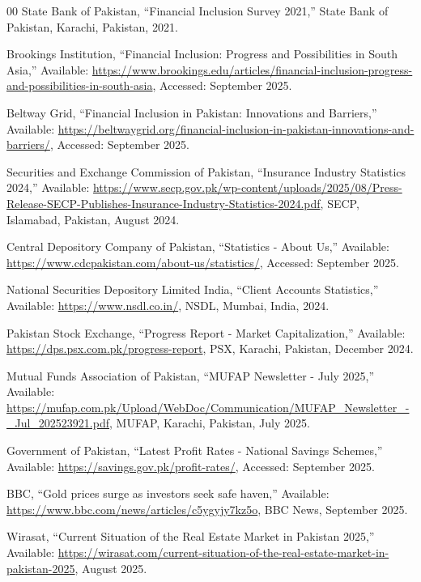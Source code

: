\documentclass[12pt]{article}
\begin{document}
\begin{thebibliography}{00}
 State Bank of Pakistan, ``Financial Inclusion Survey 2021,'' State Bank of Pakistan, Karachi, Pakistan, 2021.

 Brookings Institution, ``Financial Inclusion: Progress and Possibilities in South Asia,'' Available: \url{https://www.brookings.edu/articles/financial-inclusion-progress-and-possibilities-in-south-asia}, Accessed: September 2025.

 Beltway Grid, ``Financial Inclusion in Pakistan: Innovations and Barriers,'' Available: \url{https://beltwaygrid.org/financial-inclusion-in-pakistan-innovations-and-barriers/}, Accessed: September 2025.

 Securities and Exchange Commission of Pakistan, ``Insurance Industry Statistics 2024,'' Available: \url{https://www.secp.gov.pk/wp-content/uploads/2025/08/Press-Release-SECP-Publishes-Insurance-Industry-Statistics-2024.pdf}, SECP, Islamabad, Pakistan, August 2024.

 Central Depository Company of Pakistan, ``Statistics - About Us,'' Available: \url{https://www.cdcpakistan.com/about-us/statistics/}, Accessed: September 2025.

 National Securities Depository Limited India, ``Client Accounts Statistics,'' Available: \url{https://www.nsdl.co.in/}, NSDL, Mumbai, India, 2024.

 Pakistan Stock Exchange, ``Progress Report - Market Capitalization,'' Available: \url{https://dps.psx.com.pk/progress-report}, PSX, Karachi, Pakistan, December 2024.

 Mutual Funds Association of Pakistan, ``MUFAP Newsletter - July 2025,'' Available: \url{https://mufap.com.pk/Upload/WebDoc/Communication/MUFAP_Newsletter_-_Jul_202523921.pdf}, MUFAP, Karachi, Pakistan, July 2025.

 Government of Pakistan, ``Latest Profit Rates - National Savings Schemes,'' Available: \url{https://savings.gov.pk/profit-rates/}, Accessed: September 2025.

 BBC, ``Gold prices surge as investors seek safe haven,'' Available: \url{https://www.bbc.com/news/articles/c5ygyjy7kz5o}, BBC News, September 2025.

 Wirasat, ``Current Situation of the Real Estate Market in Pakistan 2025,'' Available: \url{https://wirasat.com/current-situation-of-the-real-estate-market-in-pakistan-2025}, August 2025.


\end{thebibliography}
\end{document}
